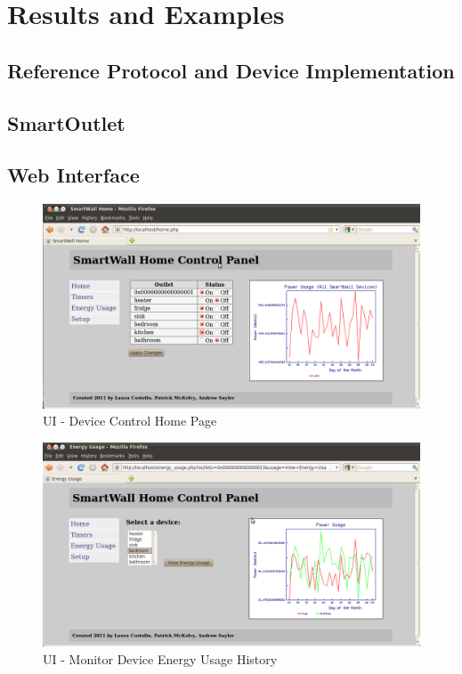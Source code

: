 \documentclass[12pt]{article}
\begin{document}
\section{Results and Examples}

\subsection{Reference Protocol and Device Implementation}

\subsection{SmartOutlet}

\subsection{Web Interface}

\begin{figure}
  \begin{center}
    \includegraphics[scale=.3]{webUI-home.png}
  \end{center}
  \caption{UI - Device Control Home Page}
  \label{fig:webUI-home}
\end{figure}

\begin{figure}
  \begin{center}
    \includegraphics[scale=.3]{webUI-energy.png}
  \end{center}
  \caption{UI - Monitor Device Energy Usage History}
  \label{fig:webUI-energy}
\end{figure}
\end{document}
